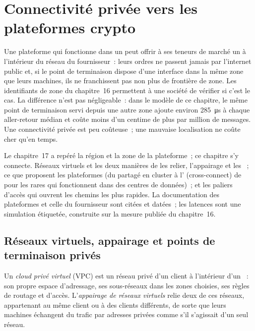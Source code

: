 \chapter{Connectivité privée vers les plateformes crypto}\label{ch:nw:private-connectivity-to-crypto-venues}

Une plateforme qui fonctionne dans un  peut offrir à ses teneurs de marché un  à l'intérieur du réseau du fournisseur~: leurs ordres ne
passent jamais par l'internet public et, si le point de terminaison dispose d'une interface dans la même zone que leurs machines, ils ne franchissent pas non plus de frontière de zone. Les
identifiants de zone du chapitre~16 permettent à une société de vérifier si c'est le cas. La différence n'est pas négligeable~: dans le modèle de ce chapitre, le même point de terminaison servi depuis une autre zone
ajoute environ \qty{285}{\micro\second} à chaque aller-retour médian et coûte moins d'un centime de plus par million de messages.
Une connectivité privée est peu coûteuse~; une mauvaise localisation ne coûte cher qu'en temps.

Le chapitre~17 a repéré la région et la zone de la plateforme~; ce chapitre s'y connecte. Réseaux virtuels et les deux manières de les relier, l'appairage et
les ~; ce que proposent les plateformes (du  partagé en cluster à l' (cross-connect) de  pour les rares qui fonctionnent dans des centres de données)~;
et les paliers d'accès qui ouvrent les chemins les plus rapides. La documentation des plateformes et celle du fournisseur sont citées et datées~; les latences sont une
simulation étiquetée, construite sur la mesure publiée du chapitre~16.

\section{Réseaux virtuels, appairage et points de terminaison privés}

\begin{definition}\label{def:nw:private-connectivity-to-crypto-venues:peering}
Un \emph{cloud privé virtuel} (VPC) est un réseau privé d'un client à l'intérieur d'un ~: son propre espace d'adressage,
ses sous-réseaux dans les zones choisies, ses règles de routage et d'accès. L'\emph{appairage de réseaux virtuels} relie deux de ces réseaux, appartenant au même client ou à des clients différents,
de sorte que leurs machines échangent du trafic par adresses privées comme s'il s'agissait d'un seul réseau.
\end{definition}

